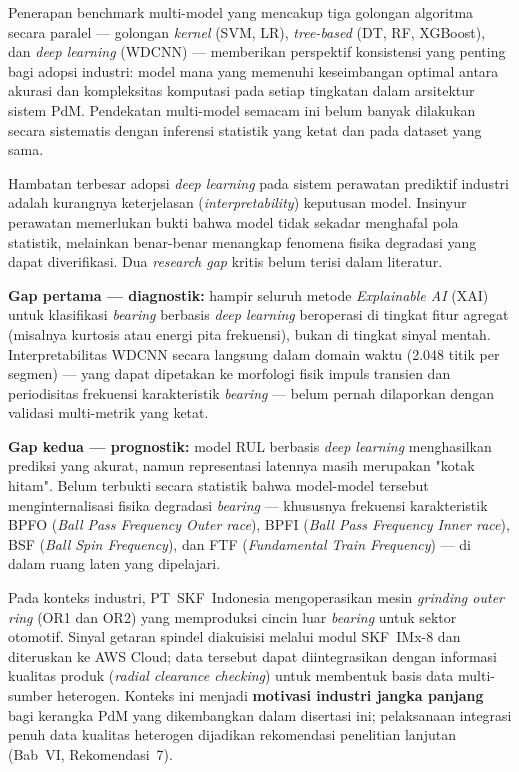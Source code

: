 Penerapan benchmark multi-model yang mencakup tiga golongan algoritma
secara paralel --- golongan \emph{kernel} (SVM, LR), \emph{tree-based}
(DT, RF, XGBoost), dan \emph{deep learning} (WDCNN) --- memberikan
perspektif konsistensi yang penting bagi adopsi industri: model mana
yang memenuhi keseimbangan optimal antara akurasi dan kompleksitas
komputasi pada setiap tingkatan dalam arsitektur sistem PdM.
Pendekatan multi-model semacam ini belum banyak dilakukan secara
sistematis dengan inferensi statistik yang ketat dan pada dataset
yang sama.

Hambatan terbesar adopsi \emph{deep learning} pada sistem perawatan
prediktif industri adalah kurangnya keterjelasan (\emph{interpretability})
keputusan model.
Insinyur perawatan memerlukan bukti bahwa model tidak sekadar menghafal
pola statistik, melainkan benar-benar menangkap fenomena fisika degradasi
yang dapat diverifikasi.
Dua \emph{research gap} kritis belum terisi dalam literatur.

\textbf{Gap pertama — diagnostik:} hampir seluruh metode \emph{Explainable
AI} (XAI) untuk klasifikasi \emph{bearing} berbasis \emph{deep learning}
beroperasi di tingkat fitur agregat (misalnya kurtosis atau energi pita
frekuensi), bukan di tingkat sinyal mentah.
Interpretabilitas WDCNN secara langsung dalam domain waktu
(2.048 titik per segmen) --- yang dapat dipetakan ke morfologi fisik
impuls transien dan periodisitas frekuensi karakteristik \emph{bearing} ---
belum pernah dilaporkan dengan validasi multi-metrik yang ketat.

\textbf{Gap kedua — prognostik:} model RUL berbasis \emph{deep learning}
menghasilkan prediksi yang akurat, namun representasi latennya masih
merupakan "kotak hitam".
Belum terbukti secara statistik bahwa model-model tersebut
menginternalisasi fisika degradasi \emph{bearing} --- khususnya frekuensi
karakteristik BPFO (\emph{Ball Pass Frequency Outer race}), BPFI
(\emph{Ball Pass Frequency Inner race}), BSF (\emph{Ball Spin
Frequency}), dan FTF (\emph{Fundamental Train Frequency}) --- di dalam
ruang laten yang dipelajari.

Pada konteks industri, PT~SKF~Indonesia mengoperasikan mesin
\emph{grinding outer ring} (OR1 dan OR2) yang memproduksi cincin luar
\emph{bearing} untuk sektor otomotif.
Sinyal getaran spindel diakuisisi melalui modul SKF~IMx-8 dan
diteruskan ke AWS Cloud; data tersebut dapat diintegrasikan
dengan informasi kualitas produk (\emph{radial clearance checking})
untuk membentuk basis data multi-sumber heterogen.
Konteks ini menjadi \textbf{motivasi industri jangka panjang} bagi
kerangka PdM yang dikembangkan dalam disertasi ini; pelaksanaan
integrasi penuh data kualitas heterogen dijadikan rekomendasi
penelitian lanjutan (Bab~VI, Rekomendasi~7).

